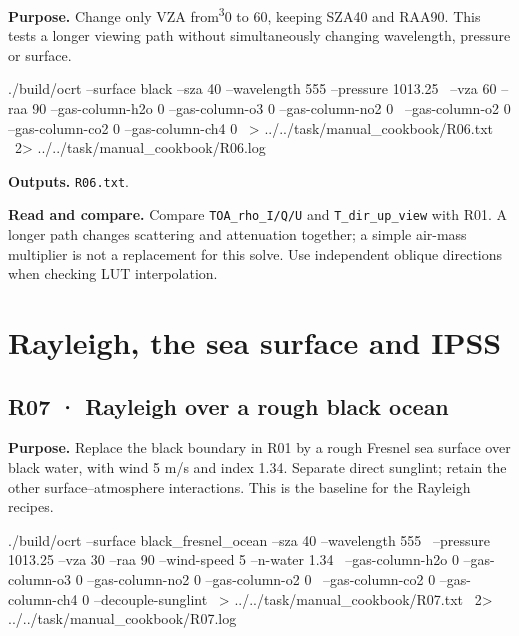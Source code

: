 \textbf{Purpose. }Change only VZA from\textsuperscript{3}0\textdegree{} to 60\textdegree{}, keeping SZA40\textdegree{} and RAA90\textdegree{}. This tests a longer viewing path without simultaneously changing wavelength, pressure or surface.

\noindent\begin{minipage}{\linewidth}
\begin{ManualCode}

./build/ocrt --surface black --sza 40 --wavelength 555 --pressure 1013.25 \
  --vza 60 --raa 90 --gas-column-h2o 0 --gas-column-o3 0 --gas-column-no2 0 \
  --gas-column-o2 0 --gas-column-co2 0 --gas-column-ch4 0 \
  > ../../task/manual_cookbook/R06.txt \
  2> ../../task/manual_cookbook/R06.log

\end{ManualCode}
\end{minipage}\par

\textbf{Outputs. }\texttt{R06.txt}.

\textbf{Read and compare. }Compare \texttt{TOA\_\allowbreak{}rho\_\allowbreak{}I/\allowbreak{}Q/\allowbreak{}U} and \texttt{T\_\allowbreak{}dir\_\allowbreak{}up\_\allowbreak{}view} with R01. A longer path changes scattering and attenuation together; a simple air-mass multiplier is not a replacement for this solve. Use independent oblique directions when checking LUT interpolation.

\Needspace{16\baselineskip}
\section{Rayleigh, the sea surface and IPSS}
\label{sec:auto:09_cookbook:3}

\Needspace{17\baselineskip}

\subsection{R07 · Rayleigh over a rough black ocean}
\label{sec:auto:09_cookbook:3.1}

\label{recipe:R07}

\textbf{Purpose. }Replace the black boundary in R01 by a rough Fresnel sea surface over black water, with wind 5 m/s and index 1.34. Separate direct sunglint; retain the other surface–atmosphere interactions. This is the baseline for the Rayleigh recipes.

\noindent\begin{minipage}{\linewidth}
\begin{ManualCode}

./build/ocrt --surface black_fresnel_ocean --sza 40 --wavelength 555 \
  --pressure 1013.25 --vza 30 --raa 90 --wind-speed 5 --n-water 1.34 \
  --gas-column-h2o 0 --gas-column-o3 0 --gas-column-no2 0 --gas-column-o2 0 \
  --gas-column-co2 0 --gas-column-ch4 0 --decouple-sunglint \
  > ../../task/manual_cookbook/R07.txt \
  2> ../../task/manual_cookbook/R07.log

\end{ManualCode}
\end{minipage}\par

